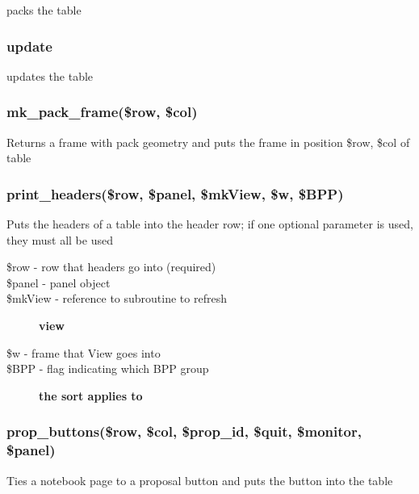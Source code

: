 \documentclass{article}
\begin{document}
packs the table

\subsubsection*{update\label{BuildTable_update}}


updates the table

\subsubsection*{mk\_pack\_frame(\$row, \$col)\label{BuildTable_mk_pack_frame_row_col_}}


Returns a frame with pack geometry and puts the frame in position \$row, \$col
of table

\subsubsection*{print\_headers(\$row, \$panel, \$mkView, \$w, \$BPP)\label{BuildTable_print_headers_row_panel_mkView_w_BPP_}}


Puts the headers of a table into the header row; if one optional parameter is
used, they must all be used

\begin{description}

\item[{\$row - row that headers go into (required)}] \mbox{}
\item[{\$panel - panel object}] \mbox{}
\item[{\$mkView - reference to subroutine to refresh}] \textbf{view}
\item[{\$w - frame that View goes into}] \mbox{}
\item[{\$BPP - flag indicating which BPP group}] \textbf{the sort applies to}\end{description}
\subsubsection*{prop\_buttons(\$row, \$col, \$prop\_id, \$quit, \$monitor, \$panel)\label{BuildTable_prop_buttons_row_col_prop_id_quit_monitor_panel_}}


Ties a notebook page to a proposal button and puts the button into the table
\end{document}
